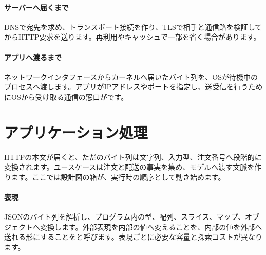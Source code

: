 \paragraph{サーバーへ届くまで}
        DNSで宛先を求め、トランスポート接続を作り、TLSで相手と通信路を検証してからHTTP要求を送ります。再利用やキャッシュで一部を省く場合があります。

\par
\endgroup
\medskip
\begingroup
\paragraph{アプリへ渡るまで}
        ネットワークインタフェースからカーネルへ届いたバイト列を、OSが待機中のプロセスへ渡します。アプリがIPアドレスやポートを指定し、送受信を行うためにOSから受け取る通信の窓口がです。

\par
\endgroup
\par
\endgroup


\section{アプリケーション処理}
\label{sec:07-practice-04}

HTTPの本文が届くと、ただのバイト列は文字列、入力型、注文番号へ段階的に変換されます。ユースケースは注文と配送の事実を集め、モデルへ渡す文脈を作ります。ここでは設計図の箱が、実行時の順序として動き始めます。

\begingroup
  \centering
  \vspace{5mm}
\begingroup
\paragraph{表現}
        JSONのバイト列を解析し、プログラム内の型、配列、スライス、マップ、オブジェクトへ変換します。外部表現を内部の値へ変えることを、内部の値を外部へ送れる形にすることをと呼びます。表現ごとに必要な容量と探索コストが異なります。

